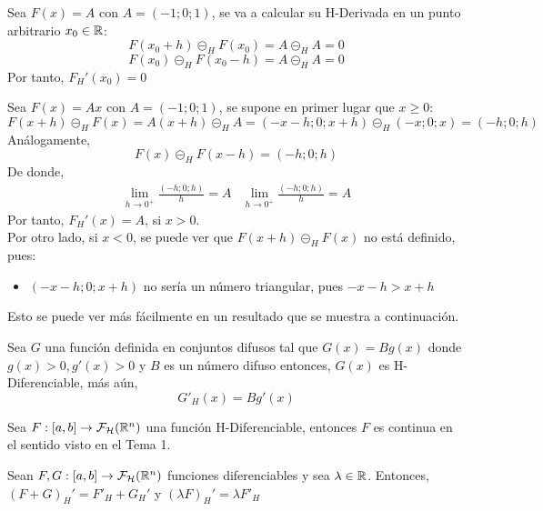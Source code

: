 \begin{ejemplo}
  Sea $F(x)=A$ con $A=(-1;0;1)$, se va a calcular su H-Derivada en un punto arbitrario $x_0 \in \mathbb R$: 
  \[
  F(x_0 + h) \circleddash_H F(x_0) = A \circleddash_H A = 0
  \]
  \[
  F(x_0) \circleddash_H F(x_0 - h) = A \circleddash_H A = 0
  \]
  Por tanto, $F_H'(x_0) = 0$
\end{ejemplo}

\begin{ejemplo}
  \label{ejemplo:hukuhara}
  Sea $F(x)=A x$ con $A=(-1; 0; 1)$, se supone en primer lugar que $x \geq 0$:
  \[
  F(x + h) \circleddash_H F(x) = A(x + h) \circleddash_H A = (-x - h; 0; x+h) \circleddash_H (-x; 0; x) = (-h; 0; h)
  \]
  Análogamente, 
  \[
  F(x) \circleddash_H F(x - h) = (-h; 0; h)
  \]
  De donde,
  \[
  \begin{array}{c||c}
    \lim\limits_{h \rightarrow 0^+} \frac{(-h; 0; h)}{h}=A & \lim\limits_{h \rightarrow 0^+} \frac{(-h; 0; h)}{h}=A
  \end{array}
  \]
  Por tanto, $F_H'(x) = A $, si $x > 0$. \\
  Por otro lado, si $x<0$, se puede ver que $F(x+h) \circleddash_H F(x)$ no está definido, pues:
  
  \begin{itemize}
  \item $(-x-h; 0; x+h)$ no sería un número triangular, pues $-x-h > x+h$
  \end{itemize}

  Esto se puede ver más fácilmente en un resultado que se muestra a continuación.
\end{ejemplo}

\begin{proposicion}
  Sea $G$ una función definida en conjuntos difusos tal que $G(x)=B g(x)$ donde $g(x)>0, g'(x)>0$ y $B$ es un número difuso entonces, $G(x)$ es H-Diferenciable, más aún, 
  \[
  G'_H(x) = B g'(x)
  \]
\end{proposicion}

\begin{teorema} Sea  $F: [a, b] \rightarrow \mathcal{F}_\mathcal{H}(\mathbb R^n)$ una función H-Diferenciable, entonces $F$ es continua en el sentido visto en el Tema 1.
\end{teorema}

\begin{teorema}
  Sean $F, G : [a, b] \rightarrow \mathcal{F}_\mathcal{H}(\mathbb R^n)$ funciones diferenciables y sea $\lambda \in \mathbb R$. Entonces, $(F+G)_H' = F'_H + G_H'$ y $(\lambda F)_H' = \lambda F'_H$
\end{teorema}

